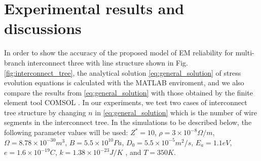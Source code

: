 \section{Experimental results and discussions}
\label{sec:experimental_results}
In order to show the accuracy of the proposed model of EM reliability for multi-branch interconnect three with line structure shown in Fig. \ref{fig:interconnect_tree}, the analytical solution \eqref{eq:general_solution} of stress evolution equations is calculated with the MATLAB enviroment, and we also compare the results from \eqref{eq:general_solution} with those obtained by the finite element tool COMSOL \cite{COMSOL}. In our experiments, we test two cases of interconnect tree structure by changing $n$ in \eqref{eq:general_solution} which is the number of wire segments in the interconnect tree. In the simulations to be described below, the following parameter values will be used: $Z^*=10$, $\rho=3\times10^{-8} \Omega/m$, $\Omega=8.78\times10^{-30}m^3$, $B=5.5\times10^{10} Pa$, $D_0=5.5\times10^{-5} m^2/s$, $E_a=1.1eV$, $e=1.6\times10^{-19}C$, $k=1.38\times10^{-23}J/K$ , and $T=350K$.

